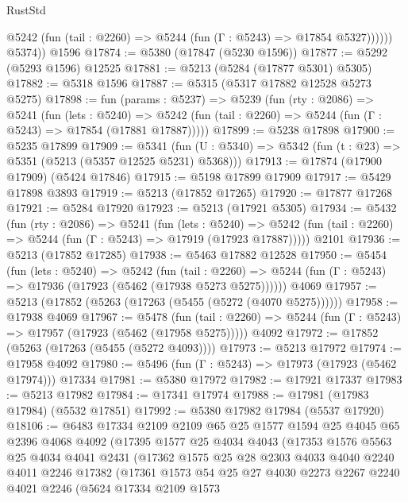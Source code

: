 \begin{lexlean}{RustStd}
\begin{coremodule}
              @5242 (fun (tail : @2260) => @5244 (fun (Γ : @5243) => @17854 @5327))))))
        @5374))
    @1596
@17874 := @5380 (@17847 (@5230 @1596))
@17877 := @5292 (@5293 @1596) @12525
@17881 := @5213 (@5284 (@17877 @5301) @5305)
@17882 := @5318 @1596
@17887 := @5315 (@5317 @17882 @12528 @5273 @5275)
@17898 := fun (params : @5237) =>
  @5239
    (fun (rty : @2086) =>
    @5241
      (fun (lets : @5240) =>
      @5242 (fun (tail : @2260) => @5244 (fun (Γ : @5243) => @17854 (@17881 @17887)))))
@17899 := @5238 @17898
@17900 := @5235 @17899
@17909 := @5341
    (fun (U : @5340) => @5342 (fun (t : @23) => @5351 (@5213 (@5357 @12525 @5231) @5368)))
@17913 := @17874 (@17900 @17909) (@5424 @17846)
@17915 := @5198 @17899 @17909
@17917 := @5429 @17898 @3893
@17919 := @5213 (@17852 @17265)
@17920 := @17877 @17268
@17921 := @5284 @17920
@17923 := @5213 (@17921 @5305)
@17934 := @5432
    (fun (rty : @2086) =>
    @5241
      (fun (lets : @5240) =>
      @5242 (fun (tail : @2260) => @5244 (fun (Γ : @5243) => @17919 (@17923 @17887)))))
    @2101
@17936 := @5213 (@17852 @17285)
@17938 := @5463 @17882 @12528
@17950 := @5454
    (fun (lets : @5240) =>
    @5242
      (fun (tail : @2260) =>
      @5244 (fun (Γ : @5243) => @17936 (@17923 (@5462 (@17938 @5273 @5275))))))
    @4069
@17957 := @5213 (@17852 (@5263 (@17263 (@5455 (@5272 (@4070 @5275))))))
@17958 := @17938 @4069
@17967 := @5478
    (fun (tail : @2260) => @5244 (fun (Γ : @5243) => @17957 (@17923 (@5462 (@17958 @5275)))))
    @4092
@17972 := @17852 (@5263 (@17263 (@5455 (@5272 @4093))))
@17973 := @5213 @17972
@17974 := @17958 @4092
@17980 := @5496 (fun (Γ : @5243) => @17973 (@17923 (@5462 @17974))) @17334
@17981 := @5380 @17972
@17982 := @17921 @17337
@17983 := @5213 @17982
@17984 := @17341 @17974
@17988 := @17981 (@17983 @17984) (@5532 @17851)
@17992 := @5380 @17982 @17984 (@5537 @17920)
@18106 := @6483
    @17334
    @2109
    @2109
    @65
    @25
    @1577
    @1594
    @25
    @4045
    @65
    @2396
    @4068
    @4092
    (@17395
      @1577
      @25
      @4034
      @4043
      (@17353
        @1576
        @5563
        @25
        @4034
        @4041
        @2431
        (@17362
          @1575
          @25
          @28
          @2303
          @4033
          @4040
          @2240
          @4011
          @2246
          @17382
          (@17361
            @1573
            @54
            @25
            @27
            @4030
            @2273
            @2267
            @2240
            @4021
            @2246
            (@5624
              @17334
              @2109
              @1573

\end{coremodule}
\end{lexlean}
